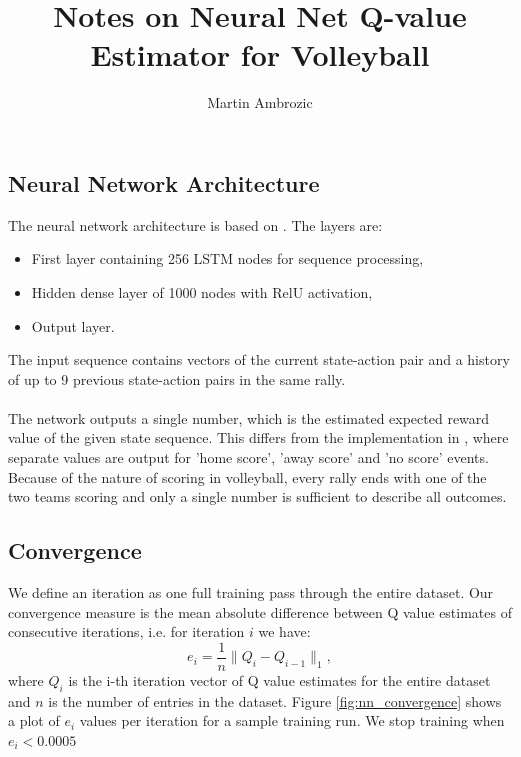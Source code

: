 \documentclass[12pt,letter]{article}
\author{Martin Ambrozic}
\title{Notes on Neural Net Q-value Estimator for Volleyball}
\date{}
\begin{document}
	
	\maketitle
	
	\subsection*{Neural Network Architecture}
	
	The neural network architecture is based on \cite{liu2018deep}. The layers are:
	\begin{itemize}
		\item First layer containing 256 LSTM nodes for sequence processing,
		\item Hidden dense layer of 1000 nodes with RelU activation,
		\item Output layer.
	\end{itemize}
	The input sequence contains vectors of the current state-action pair and a history of up to 9 previous state-action pairs in the same rally.\\\\
	The network outputs a single number, which is the estimated expected reward value of the given state sequence. This differs from the implementation in \cite{liu2018deep}, where separate values are output for 'home score', 'away score' and 'no score' events. Because of the nature of scoring in volleyball, every rally ends with one of the two teams scoring and only a single number is sufficient to describe all outcomes.

	\subsection*{Convergence}
	
	We define an iteration as one full training pass through the entire dataset. Our convergence measure is the mean absolute difference between Q value estimates of consecutive iterations, i.e. for iteration $i$ we have:
	$$e_i = \frac{1}{n}\|Q_i - Q_{i-1}\|_1,$$
	where $Q_i$ is the i-th iteration vector of Q value estimates for the entire dataset and $n$ is the number of entries in the dataset. Figure \ref{fig:nn_convergence} shows a plot of $e_i$ values per iteration for a sample training run. We stop training when $e_i < 0.0005$ \\\\
	
\end{document}
